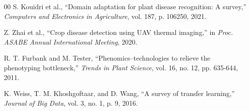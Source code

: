 \documentclass[conference]{IEEEtran}
\begin{document}
\begin{thebibliography}{00}
S. Kouidri et al., ``Domain adaptation for plant disease recognition: A survey,'' \textit{Computers and Electronics in Agriculture}, vol. 187, p. 106250, 2021.

Z. Zhai et al., ``Crop disease detection using UAV thermal imaging,'' in \textit{Proc. ASABE Annual International Meeting}, 2020.

R. T. Furbank and M. Tester, ``Phenomics–technologies to relieve the phenotyping bottleneck,'' \textit{Trends in Plant Science}, vol. 16, no. 12, pp. 635-644, 2011.

K. Weiss, T. M. Khoshgoftaar, and D. Wang, ``A survey of transfer learning,'' \textit{Journal of Big Data}, vol. 3, no. 1, p. 9, 2016.

\end{thebibliography}
\end{document}
